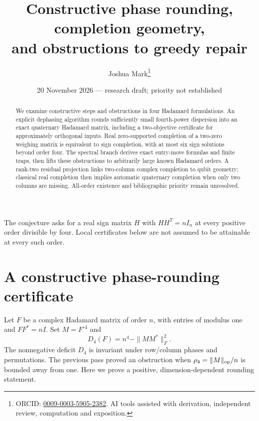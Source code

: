 \documentclass[11pt]{article}
\title{Constructive phase rounding, completion geometry,\\and obstructions to greedy repair}
\author{Joshua Mark\thanks{ORCID: \href{https://orcid.org/0009-0003-5905-2382}{0009-0003-5905-2382}. AI tools assisted with derivation, independent review, computation and exposition.}}
\date{20 November 2026 --- research draft; priority not established}
\begin{document}
\maketitle

\begin{abstract}
We examine constructive steps and obstructions in four Hadamard
formulations. An explicit dephasing algorithm rounds sufficiently
small fourth-power dispersion into an exact quaternary Hadamard
matrix, including a two-objective certificate for approximately
orthogonal inputs. Real zero-supported completion of a two-zero
weighing matrix is equivalent to sign completion, with at most six
sign solutions beyond order four. The spectral branch derives exact
entry-move formulas and finite traps, then lifts these obstructions
to arbitrarily large known Hadamard orders. A rank-two residual
projection links two-column complex completion to qubit geometry;
classical real completion then implies automatic quaternary completion
when only two columns are missing.
All-order existence and bibliographic priority remain unresolved.
\end{abstract}
The conjecture asks for a real sign matrix $H$ with $HH^T=nI_n$
at every positive order divisible by four. Local certificates below
are not assumed to be attainable at every such order.
\section{A constructive phase-rounding certificate}
Let $F$ be a complex Hadamard matrix of order $n$, with entries of
modulus one and $FF^*=nI$. Set $M=F^{\circ4}$ and
\[
 D_4(F)=n^4-\|MM^*\|_F^2.
\]
The nonnegative deficit $D_4$ is invariant under row/column phases
and permutations. The previous pass proved an obstruction when
$\rho_4=\|M\|_{\rm op}/n$ is bounded away from one. Here we prove a
positive, dimension-dependent rounding statement.
\end{document}

